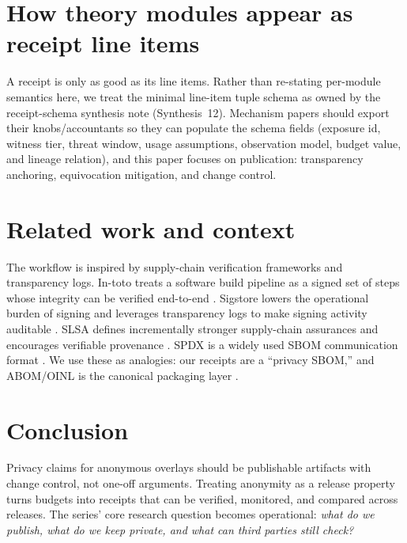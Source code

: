 \documentclass[11pt]{article}
\begin{document}
\section{How theory modules appear as receipt line items}
A receipt is only as good as its line items.
Rather than re-stating per-module semantics here, we treat the minimal line-item tuple schema as owned by the receipt-schema synthesis note (Synthesis~12).\cite{series:receiptitems}
Mechanism papers should export their knobs/accountants so they can populate the schema fields (exposure id, witness tier, threat window, usage assumptions, observation model, budget value, and lineage relation), and this paper focuses on publication: transparency anchoring, equivocation mitigation, and change control.

\section{Related work and context}
The workflow is inspired by supply-chain verification frameworks and transparency logs.
In-toto treats a software build pipeline as a signed set of steps whose integrity can be verified end-to-end \cite{torresarias_intoto_sec19}.
Sigstore lowers the operational burden of signing and leverages transparency logs to make signing activity auditable \cite{sigstore_ccs2022}.
SLSA defines incrementally stronger supply-chain assurances and encourages verifiable provenance \cite{slsa_v1}.
SPDX is a widely used SBOM communication format \cite{spdx_301}.
We use these as analogies: our receipts are a ``privacy SBOM,'' and ABOM/OINL is the canonical packaging layer \cite{series:abom}.

\section{Conclusion}
Privacy claims for anonymous overlays should be publishable artifacts with change control, not one-off arguments.
Treating anonymity as a release property turns budgets into receipts that can be verified, monitored, and compared across releases.
The series' core research question becomes operational: \emph{what do we publish, what do we keep private, and what can third parties still check?}
\end{document}
